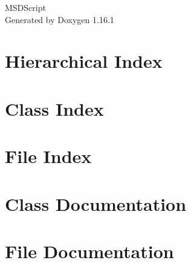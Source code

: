 \documentclass[twoside]{book}
\newcommand{\+}{\discretionary{\mbox{\scriptsize$\hookleftarrow$}}{}{}}
\newcommand{\clearemptydoublepage}{%
    \newpage{\pagestyle{empty}\cleardoublepage}%
  }
\begin{document}
  \raggedbottom
    \hypersetup{pageanchor=false,
                bookmarksnumbered=true,
                pdfencoding=unicode
               }
  \begin{titlepage}
  \vspace*{7cm}
  \begin{center}%
  {\Large MSDScript}\\
  \vspace*{1cm}
  {\large Generated by Doxygen 1.16.1}\\
  \end{center}
  \end{titlepage}
  \clearemptydoublepage
  \tableofcontents
  \clearemptydoublepage
  \hypersetup{pageanchor=true}

\chapter{Hierarchical Index}

\chapter{Class Index}

\chapter{File Index}

\chapter{Class Documentation}





\chapter{File Documentation}







  \backmatter
  \newpage
  \clearemptydoublepage
  \printindex
\end{document}
